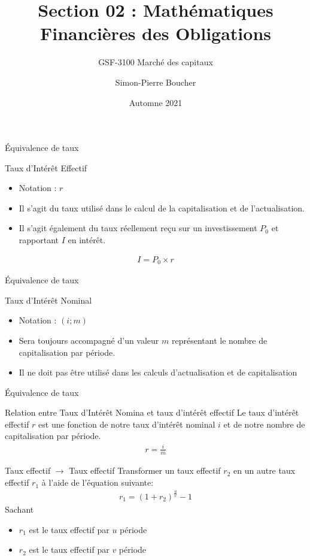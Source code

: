 \documentclass{beamer}
\title[S02 Mathématique]{Section 02 : Mathématiques Financières des Obligations}
\subtitle{GSF-3100 Marché des capitaux}
\author[SP. Boucher]{Simon-Pierre Boucher\inst{1}}
\institute[Université Laval]
{
  \inst{1}%
  Département de finance, assurance et immobilier\\
  Faculté des sciences de l'administration\\
  Université Laval}
\date[Automne 2021]{Automne 2021}
\begin{document}
\begin{frame}
\titlepage
\end{frame}


\begin{frame}{Équivalence de taux}
\begin{block}{Taux d'Intérêt Effectif}
\begin{itemize}
\item Notation : $r$
\item Il s'agit du taux utilisé dans le calcul de la capitalisation et de l'actualisation. 
\item Il s'agit également du taux réellement reçu sur un investissement $P_0$ et rapportant $I$ en intérêt.
\end{itemize}
\begin{align*}
I=P_0 \times r
\end{align*}
\end{block}
\end{frame}


\begin{frame}{Équivalence de taux}
\begin{block}{Taux d'Intérêt Nominal}
\begin{itemize}
\item Notation : $(i;m)$
\item Sera toujours accompagné d'un valeur $m$ représentant le nombre de capitalisation par période.
\item Il ne doit pas être utilisé dans les calculs d’actualisation et de capitalisation
\end{itemize}
\end{block}
\end{frame}


\begin{frame}{Équivalence de taux}
\begin{block}{Relation entre Taux d'Intérêt Nomina et taux d'intérêt effectif}
Le taux d'intérêt effectif $r$ est une fonction de notre taux d'intérêt nominal $i$ et de notre nombre de capitalisation par période. 
\begin{align*}
r=\frac{i}{m}
\end{align*}
\end{block}
\end{frame}

\begin{frame}{Taux effectif $\rightarrow$ Taux effectif}
Transformer un taux effectif $r_2$ en un autre taux effectif $r_1$ à l'aide de l'équation suivante:
\begin{align*}
r_1 =(1+r_2)^{\frac{u}{v}}-1
\end{align*}
Sachant 
\begin{itemize}
\item $r_1$ est le taux effectif par $u$ période 
\item $r_2$ est le taux effectif par $v$ période 
\end{itemize}
\end{frame}
\end{document}
